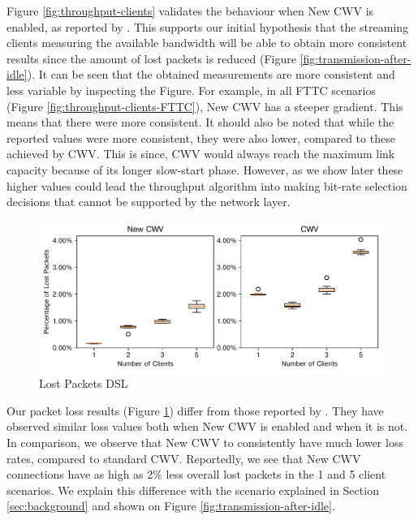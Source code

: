 \documentclass[10pt,sigconf,anonymous]{acmart}
\begin{document}
Figure \ref{fig:throughput-clients} validates the behaviour when New CWV is enabled, as reported by \cite{Nazir-2014-performance-evaluation-congestion-window-validation-dash-newcwv}. This supports our initial hypothesis that the streaming clients measuring the available bandwidth will be able to obtain more consistent results since the amount of lost packets is reduced (Figure \ref{fig:transmission-after-idle}). It can be seen that the obtained measurements are more consistent and less variable by inspecting the Figure. For example, in all FTTC scenarios (Figure \ref{fig:throughput-clients-FTTC}), New CWV has a steeper gradient. This means that there were more consistent. It should also be noted that while the reported values were more consistent, they were also lower, compared to these achieved by CWV. This is since, CWV would always reach the maximum link capacity because of its longer slow-start phase. However, as we show later these higher values could lead the throughput algorithm into making bit-rate selection decisions that cannot be supported by the network layer.

\begin{figure}[t!]
  \centering
  \includegraphics[width=.45\textwidth]{figures/lost_packets.pdf}
  \caption{Lost Packets DSL}
  \label{fig:lost-packets}
\end{figure}

Our packet loss results (Figure \ref{fig:lost-packets}) differ from those reported by \cite{Nazir-2014-performance-evaluation-congestion-window-validation-dash-newcwv}. They have observed similar loss values both when New CWV is enabled and when it is not. In comparison, we observe that New CWV to consistently have much lower loss rates, compared to standard CWV. Reportedly, we see that New CWV connections have as high as 2\% less overall lost packets in the 1 and 5 client scenarios. We explain this difference with the scenario explained in Section \ref{sec:background} and shown on Figure \ref{fig:transmission-after-idle}.

\end{document}
